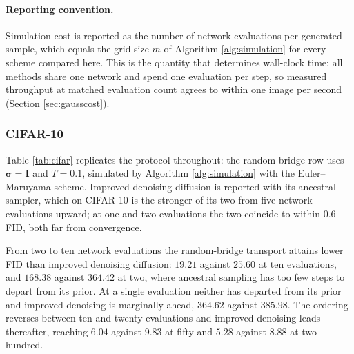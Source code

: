 \paragraph{Reporting convention.} Simulation cost is reported as the number of
network evaluations per generated sample, which equals the grid size $m$ of
Algorithm \ref{alg:simulation} for every scheme compared here. This is the
quantity that determines wall-clock time: all methods share one network and
spend one evaluation per step, so measured throughput at matched evaluation
count agrees to within one image per second (Section \ref{sec:gausscost}).

\subsubsection*{CIFAR-10}

\begin{table}[htbp]
\begin{center}
\caption{CIFAR-10. FID against the training split, $50\,000$ generated samples
per entry, extrapolated floor $0.67$ (measured $3.15$ at $n=10\,000$).
Simulation cost is the number of network
evaluations per sample. Bold marks the best entry in each column; a dash marks a
configuration not run.}
\label{tab:cifar}
\vskip 0.1in
\resizebox{\textwidth}{!}{}
\end{center}
\end{table}

Table \ref{tab:cifar} replicates the protocol throughout: the random-bridge row
uses $\boldsymbol{\sigma}=\boldsymbol{I}$ and $T=0.1$, simulated by Algorithm
\ref{alg:simulation} with the Euler--Maruyama scheme. Improved denoising
diffusion is reported with its ancestral sampler, which on CIFAR-10 is the
stronger of its two from five network evaluations upward; at one and two
evaluations the two coincide to within $0.6$ FID, both far from convergence.

From two to ten network evaluations the random-bridge transport attains lower
FID than improved denoising diffusion: $19.21$ against $25.60$ at ten
evaluations, and $168.38$ against $364.42$ at two, where ancestral sampling has
too few steps to depart from its prior. At a single evaluation neither has
departed from its prior and improved denoising is marginally ahead, $364.62$
against $385.98$. The ordering reverses between ten and twenty evaluations and
improved denoising leads thereafter, reaching $6.04$ against
$9.83$ at fifty and $5.28$ against $8.88$ at two hundred.

